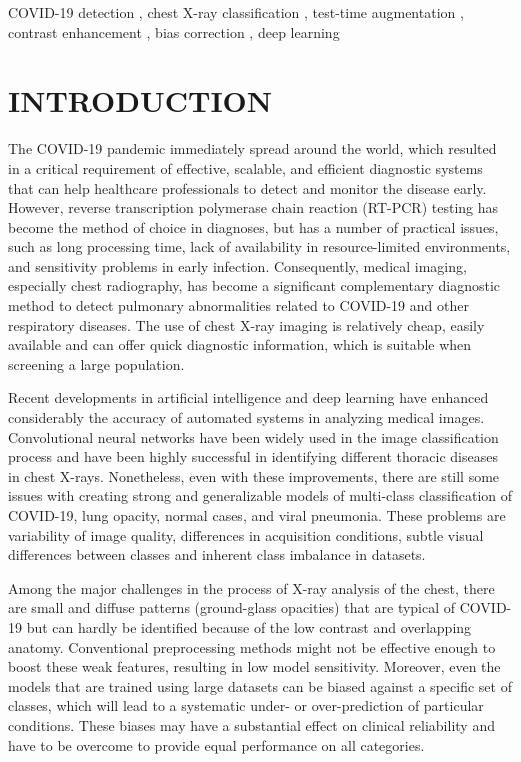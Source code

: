 \documentclass[a4paper,fleqn]{cas-dc}
\begin{document}
\begin{keywords}
COVID-19 detection \sep 
chest X-ray classification \sep 
test-time augmentation \sep 
contrast enhancement \sep 
bias correction \sep 
deep learning
\end{keywords}

\maketitle

\section{INTRODUCTION}
The COVID-19 pandemic immediately spread around the world, which resulted in a critical requirement of effective, scalable, and efficient diagnostic systems that can help healthcare professionals to detect and monitor the disease early. However, reverse transcription polymerase chain reaction (RT-PCR) testing has become the method of choice in diagnoses, but has a number of practical issues, such as long processing time, lack of availability in resource-limited environments, and sensitivity problems in early infection. Consequently, medical imaging, especially chest radiography, has become a significant complementary diagnostic method to detect pulmonary abnormalities related to COVID-19 and other respiratory diseases. The use of chest X-ray imaging is relatively cheap, easily available and can offer quick diagnostic information, which is suitable when screening a large population.

Recent developments in artificial intelligence and deep learning have enhanced considerably the accuracy of automated systems in analyzing medical images. Convolutional neural networks have been widely used in the image classification process and have been highly successful in identifying different thoracic diseases in chest X-rays. Nonetheless, even with these improvements, there are still some issues with creating strong and generalizable models of multi-class classification of COVID-19, lung opacity, normal cases, and viral pneumonia. These problems are variability of image quality, differences in acquisition conditions, subtle visual differences between classes and inherent class imbalance in datasets.

Among the major challenges in the process of X-ray analysis of the chest, there are small and diffuse patterns (ground-glass opacities) that are typical of COVID-19 but can hardly be identified because of the low contrast and overlapping anatomy. Conventional preprocessing methods might not be effective enough to boost these weak features, resulting in low model sensitivity. Moreover, even the models that are trained using large datasets can be biased against a specific set of classes, which will lead to a systematic under- or over-prediction of particular conditions. These biases may have a substantial effect on clinical reliability and have to be overcome to provide equal performance on all categories.
\end{document}
